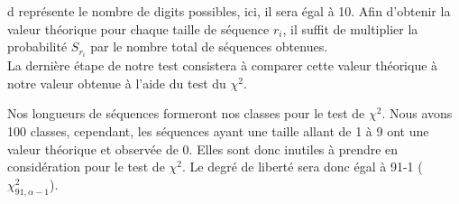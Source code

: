 \documentclass[french]{article}
\begin{document}
d représente le nombre de digits possibles, ici, il sera égal à 10.
Afin d'obtenir la valeur théorique pour chaque taille de séquence \textit{$ r_{i} $}, il suffit de multiplier la probabilité $S_{r_{i}}$  par le nombre total de séquences obtenues.
\\

La dernière étape de notre test consistera à comparer cette valeur théorique à notre valeur obtenue à l'aide du test du $\chi^{2}$.

Nos longueurs de séquences formeront nos classes pour le test de $\chi^{2}$. Nous avons 100 classes, cependant, les séquences ayant une taille allant de 1 à 9 ont une valeur théorique et observée de 0. Elles sont donc inutiles à prendre en considération pour le test de $\chi^{2}$.  Le degré de liberté sera donc égal à 91-1 ($\chi^{2}_{91,\alpha-1}$).
\newpage
\end{document}
